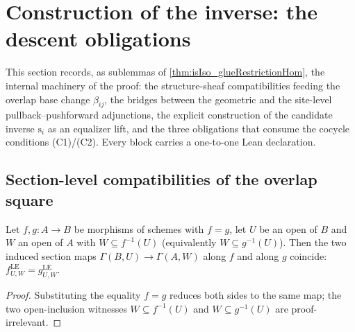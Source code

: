 \section{Construction of the inverse: the descent obligations}
\label{sec:gd_inverse}

This section records, as sublemmas of \cref{thm:isIso_glueRestrictionHom}, the
internal machinery of the proof: the structure-sheaf compatibilities feeding the
overlap base change \(\beta_{ij}\), the bridges between the geometric and the
site-level pullback--pushforward adjunctions, the explicit construction of the
candidate inverse \(\mathrm{s}_i\) as an equalizer lift, and the three obligations
that consume the cocycle conditions (C1)/(C2). Every block carries a one-to-one Lean
declaration.

\subsection{Section-level compatibilities of the overlap square}

\begin{lemma}\leanok
  \label{lem:gr_appLE_congr_mor}
  Let \(f, g : A \to B\) be morphisms of schemes with \(f = g\), let \(U\) be an open of
  \(B\) and \(W\) an open of \(A\) with \(W \subseteq f^{-1}(U)\) (equivalently
  \(W \subseteq g^{-1}(U)\)). Then the two induced section maps
  \(\Gamma(B, U) \to \Gamma(A, W)\) along \(f\) and along \(g\) coincide:
  \(f^{\mathrm{LE}}_{U,W} = g^{\mathrm{LE}}_{U,W}\).
\end{lemma}
\begin{proof}

\leanok
  Substituting the equality \(f = g\) reduces both sides to the same map; the two
  open-inclusion witnesses \(W \subseteq f^{-1}(U)\) and \(W \subseteq g^{-1}(U)\) are
  proof-irrelevant.
\end{proof}


